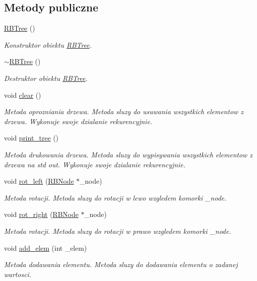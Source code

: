 \subsection*{Metody publiczne}
\begin{DoxyCompactItemize}
\item 
\hyperlink{class_r_b_tree_a19921f34f32f777bb3c4b85d4ff1d9de}{R\-B\-Tree} ()
\begin{DoxyCompactList}\small\item\em Konstruktor obiektu \hyperlink{class_r_b_tree}{R\-B\-Tree}. \end{DoxyCompactList}\item 
\hyperlink{class_r_b_tree_abab51e54e07c1adf0ca0c9a5d466427b}{$\sim$\-R\-B\-Tree} ()
\begin{DoxyCompactList}\small\item\em Destruktor obiektu \hyperlink{class_r_b_tree}{R\-B\-Tree}. \end{DoxyCompactList}\item 
void \hyperlink{class_r_b_tree_aa0127eced84667918a344ee7739b9811}{clear} ()
\begin{DoxyCompactList}\small\item\em Metoda oprozniania drzewa. Metoda sluzy do usuwania wszystkich elementow z drzewa. Wykonuje swoje dzialanie rekurencyjnie. \end{DoxyCompactList}\item 
void \hyperlink{class_r_b_tree_af045f7f6e6bfc35cab6cb94c5c0d305f}{print\-\_\-tree} ()
\begin{DoxyCompactList}\small\item\em Metoda drukowania drzewa. Metoda sluzy do wypisywania wszystkich elementow z drzewa na std out. Wykonuje swoje dzialanie rekurencyjnie. \end{DoxyCompactList}\item 
void \hyperlink{class_r_b_tree_a0025428da80878d6965d80f2b94572f3}{rot\-\_\-left} (\hyperlink{struct_r_b_node}{R\-B\-Node} $\ast$\-\_\-node)
\begin{DoxyCompactList}\small\item\em Metoda rotacji. Metoda sluzy do rotacji w lewo wzgledem komorki \-\_\-node. \end{DoxyCompactList}\item 
void \hyperlink{class_r_b_tree_aaabf0c18f855a0ba78f165668ec01fda}{rot\-\_\-right} (\hyperlink{struct_r_b_node}{R\-B\-Node} $\ast$\-\_\-node)
\begin{DoxyCompactList}\small\item\em Metoda rotacji. Metoda sluzy do rotacji w prawo wzgledem komorki \-\_\-node. \end{DoxyCompactList}\item 
void \hyperlink{class_r_b_tree_a48854977f8fd0b49f99ef1ec19dc1d16}{add\-\_\-elem} (int \-\_\-elem)
\begin{DoxyCompactList}\small\item\em Metoda dodawania elementu. Metoda sluzy do dodawania elementu o zadanej wartosci. \end{DoxyCompactList}\end{DoxyCompactItemize}
